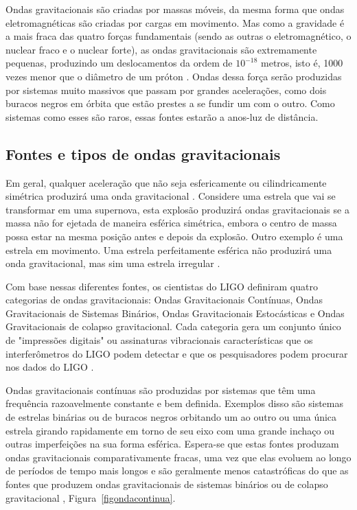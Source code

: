 Ondas gravitacionais são criadas por massas móveis, da mesma forma que ondas eletromagnéticas são criadas por cargas em movimento. Mas como a gravidade é a mais fraca das quatro forças fundamentais (sendo as outras o eletromagnético, o nuclear fraco e o nuclear forte), as ondas gravitacionais são extremamente pequenas, produzindo um deslocamentos da ordem de \(10^{-18}\) metros, isto é, 1000 vezes menor que o diâmetro de um próton \cite{abbott2016observation}. Ondas dessa força serão produzidas por sistemas muito massivos que passam por grandes acelerações, como dois buracos negros em órbita que estão prestes a se fundir um com o outro. Como sistemas como esses são raros, essas fontes estarão a anos-luz de distância.

\subsection{Fontes e tipos de ondas gravitacionais}
\label{subsec:ondas-gravitacionais:fontes}

Em geral, qualquer aceleração que não seja esfericamente ou cilindricamente simétrica produzirá uma onda gravitacional \cite{abbott2017gw170814}. Considere uma estrela que vai se transformar em uma supernova, esta explosão produzirá ondas gravitacionais se a massa não for ejetada de maneira esférica simétrica, embora o centro de massa possa estar na mesma posição antes e depois da explosão. Outro exemplo é uma estrela em movimento. Uma estrela perfeitamente esférica não produzirá uma onda gravitacional, mas sim uma estrela irregular \cite{abbott2017gw170817}.

Com base nessas diferentes fontes, os cientistas do LIGO definiram quatro categorias de ondas gravitacionais: Ondas Gravitacionais Contínuas, Ondas Gravitacionais de Sistemas Binários, Ondas Gravitacionais Estocásticas e Ondas Gravitacionais de colapso gravitacional. Cada categoria gera um conjunto único de "impressões digitais" ou assinaturas vibracionais características que os interferômetros do LIGO podem detectar e que os pesquisadores podem procurar nos dados do LIGO \cite{Christensen_2018}.

Ondas gravitacionais contínuas são produzidas por sistemas que têm uma frequência razoavelmente constante e bem definida. Exemplos disso são sistemas de estrelas binárias ou de buracos negros orbitando um ao outro ou uma única estrela girando rapidamente em torno de seu eixo com uma grande inchaço ou outras imperfeições na sua forma esférica. Espera-se que estas fontes produzam ondas gravitacionais comparativamente fracas, uma vez que elas evoluem ao longo de períodos de tempo mais longos e são geralmente menos catastróficas do que as fontes que produzem ondas gravitacionais de sistemas binários ou de colapso gravitacional \cite{beheshtipour2020deep}, Figura~\ref{figondacontinua}.

